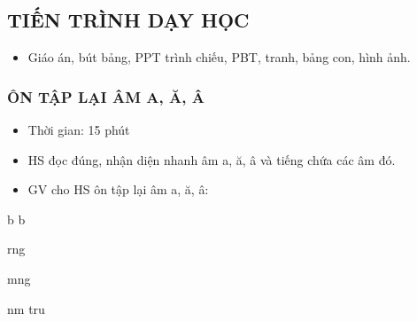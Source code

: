 \documentclass[../main.tex]{subfiles}
\begin{document}
\subsection{TIẾN TRÌNH DẠY HỌC}
\begin{itemize}\GAgon
    \item Giáo án, bút bảng, PPT trình chiếu, PBT, tranh, bảng con, hình ảnh.
\end{itemize}

\subsubsection{ ÔN TẬP LẠI ÂM A, Ă, Â}
\begin{hd}
    \begin{itemize}\GAgon
        \item Thời gian: 15 phút
        \item HS đọc đúng, nhận diện nhanh âm a, ă, â và tiếng chứa các âm đó.
    \end{itemize}
\end{hd}
\begin{itemize}\GAgon
    \item GV cho HS ôn tập lại âm a, ă, â:
\end{itemize}
\GAbatdauhinh
{\centering
    \par\nopagebreak\vspace{6pt}
                {}{b}
                {}{b}\par\vspace{6pt}
    \par\nopagebreak\vspace{6pt}
                {\begin{scope}[shift={(0,-0.05)},scale=0.95]\GArang\end{scope}}{rng}
                {\begin{scope}[shift={(0,-1.15)},scale=1.15]\GAmang\end{scope}}{mng}\par\vspace{6pt}
    \par\nopagebreak\vspace{6pt}
                {\begin{scope}[shift={(0,-0.15)},scale=0.95]\GAnam\end{scope}}{nm}
                {}{tru}\par}
\end{document}

